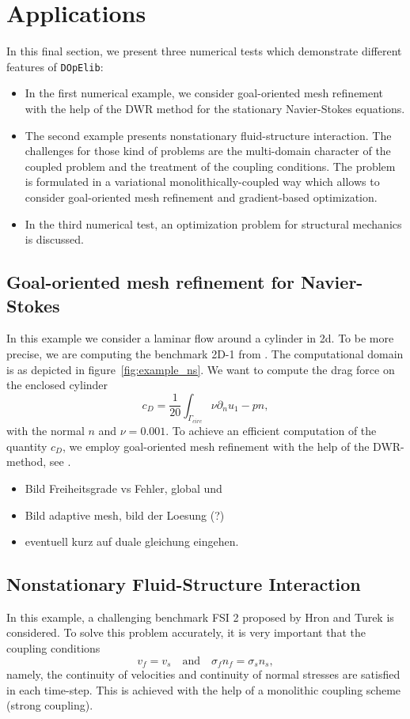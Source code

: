 \documentclass[prodmode,acmtoms]{acmsmall}
\numberwithin{equation}{section}
\newcommand{\dope}{\texttt{DOpElib}}
\begin{document}
\section{Applications}
\label{applications}
In this final section, 
we present three numerical tests which demonstrate different
features of \dope{}:
\begin{itemize}
\item In the first numerical example, we consider 
goal-oriented mesh refinement with the help of the 
DWR method for the stationary Navier-Stokes equations.
\item The second example presents nonstationary fluid-structure 
interaction. The challenges for those kind of problems are the multi-domain
character of the coupled problem and the treatment of the coupling conditions.
The problem is formulated in a variational monolithically-coupled way which 
allows to consider goal-oriented mesh refinement and gradient-based optimization.
\item In the third numerical test, an optimization problem for structural mechanics
is discussed.
\end{itemize}

\subsection{Goal-oriented mesh refinement for Navier-Stokes}
In this example we consider a laminar flow around a cylinder in 2d. To be more precise, we are computing the benchmark 2D-1 from \cite{TuSchae96}. The computational domain is as depicted in figure~\ref{fig:example_ns}. We want to compute the drag force on the enclosed cylinder
\begin{equation}
c_D = \frac 1 {20} \int_{\Gamma_{circ}} \nu\partial_nu _1 - pn,
\end{equation}
with the normal $n$ and $\nu = 0.001$. To achieve an efficient computation of the quantity $c_D$, we employ goal-oriented mesh refinement with the help of the DWR-method, see \cite{BeRa96}.

\begin{itemize}
\item Bild Freiheitsgrade vs Fehler, global und 
\item Bild adaptive mesh, bild der Loesung (?)
\item eventuell kurz auf duale gleichung eingehen.
\end{itemize}

\subsection{Nonstationary Fluid-Structure Interaction}
In this example, a challenging benchmark FSI 2
proposed by Hron and Turek \cite{HrTu06b} is considered.
To solve this problem accurately, it is very important that 
the coupling conditions
\[
v_f = v_s \quad \text{and} \quad \sigma_f n_f = \sigma_s n_s, 
\]
namely, the continuity of velocities and continuity of normal stresses
are satisfied in each time-step. This is achieved with the help of 
a monolithic coupling scheme (strong coupling).
\end{document}
